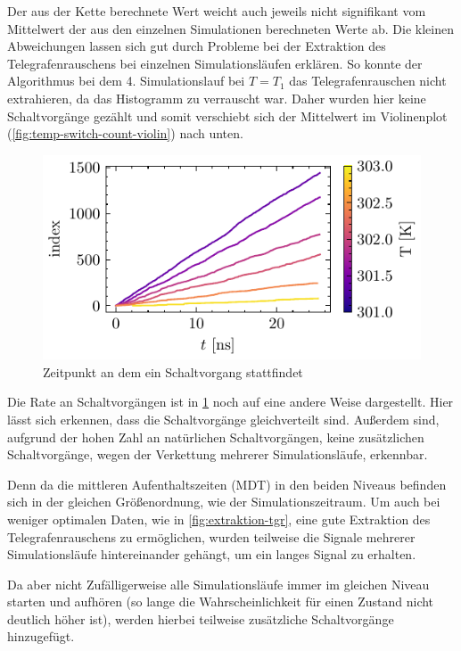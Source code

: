 \documentclass[main.tex]{subfiles}
\begin{document}
Der aus der Kette berechnete Wert weicht auch jeweils nicht signifikant vom Mittelwert der aus den einzelnen Simulationen berechneten Werte ab.
Die kleinen Abweichungen lassen sich gut durch Probleme bei der Extraktion des Telegrafenrauschens bei einzelnen Simulationsläufen erklären. So konnte der Algorithmus bei dem 4. Simulationslauf bei \(T=T_1\) das Telegrafenrauschen nicht extrahieren, da das Histogramm zu verrauscht war. Daher wurden hier keine Schaltvorgänge gezählt und somit verschiebt sich der Mittelwert im Violinenplot (\cref{fig:temp-switch-count-violin}) nach unten.


\begin{figure}[H]
    \centering
    \includegraphics{bilder/plots/temp_comparison/switch_events.pdf}
    \caption{Zeitpunkt an dem ein Schaltvorgang stattfindet}\label{fig:switch-events}
\end{figure}


Die Rate an Schaltvorgängen ist in 
\cref{fig:switch-events} noch auf eine andere Weise dargestellt. Hier lässt sich erkennen, dass die Schaltvorgänge gleichverteilt sind. Außerdem sind, aufgrund der hohen Zahl an natürlichen Schaltvorgängen, keine zusätzlichen Schaltvorgänge, wegen der Verkettung mehrerer Simulationsläufe, erkennbar. 

Denn da die mittleren Aufenthaltszeiten (MDT) in den beiden Niveaus befinden sich in der gleichen Größenordnung, wie der Simulationszeitraum. Um auch bei weniger optimalen Daten, wie in \cref{fig:extraktion-tgr}, eine gute Extraktion des Telegrafenrauschens zu ermöglichen, wurden teilweise die Signale mehrerer Simulationsläufe hintereinander gehängt, um ein langes Signal zu erhalten.

Da aber nicht Zufälligerweise alle Simulationsläufe immer im gleichen Niveau starten und aufhören (so lange die Wahrscheinlichkeit für einen Zustand nicht deutlich höher ist), werden hierbei teilweise zusätzliche Schaltvorgänge hinzugefügt. 
\end{document}
